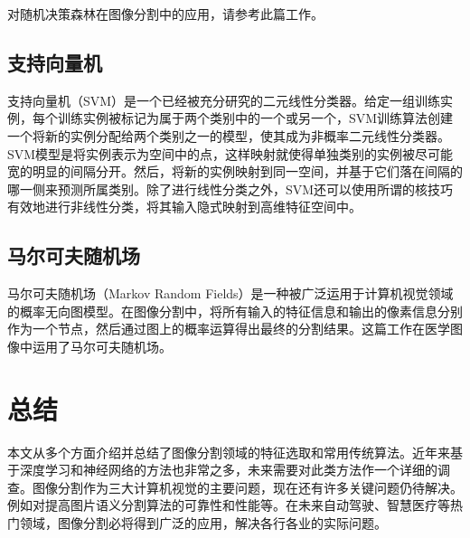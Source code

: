 \documentclass{article}
\begin{document}
对随机决策森林在图像分割中的应用，请参考此篇工作\cite{inproceedings}。

\subsection{支持向量机}
支持向量机（SVM）是一个已经被充分研究的二元线性分类器。给定一组训练实例，每个训练实例被标记为属于两个类别中的一个或另一个，SVM训练算法创建一个将新的实例分配给两个类别之一的模型，使其成为非概率二元线性分类器。SVM模型是将实例表示为空间中的点，这样映射就使得单独类别的实例被尽可能宽的明显的间隔分开。然后，将新的实例映射到同一空间，并基于它们落在间隔的哪一侧来预测所属类别。除了进行线性分类之外，SVM还可以使用所谓的核技巧有效地进行非线性分类，将其输入隐式映射到高维特征空间中。

\subsection{马尔可夫随机场}
马尔可夫随机场（Markov Random Fields）是一种被广泛运用于计算机视觉领域的概率无向图模型。在图像分割中，将所有输入的特征信息和输出的像素信息分别作为一个节点，然后通过图上的概率运算得出最终的分割结果。这篇工作在医学图像中运用了马尔可夫随机场\citep{Zhang2001}。

\section{总结}
本文从多个方面介绍并总结了图像分割领域的特征选取和常用传统算法。近年来基于深度学习和神经网络的方法也非常之多，未来需要对此类方法作一个详细的调查。图像分割作为三大计算机视觉的主要问题，现在还有许多关键问题仍待解决。例如对提高图片语义分割算法的可靠性和性能等。在未来自动驾驶、智慧医疗等热门领域，图像分割必将得到广泛的应用，解决各行各业的实际问题。





\end{document}
